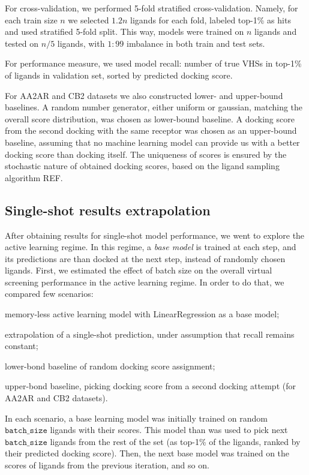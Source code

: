 For cross-validation, we performed 5-fold stratified cross-validation. Namely, for each train size $n$ we selected $1.2n$ ligands for each fold, labeled top-1\% as hits and used stratified 5-fold split. This way, models were trained on $n$ ligands and tested on $n/5$ ligands, with $1:99$ imbalance in both train and test sets.

For performance measure, we used model recall: number of true VHSs in top-1\% of ligands in validation set, sorted by predicted docking score.

For AA2AR and CB2 datasets we also constructed lower- and upper-bound baselines. A random number generator, either uniform or gaussian, matching the overall score distribution, was chosen as lower-bound baseline. A docking score from the second docking with the same receptor was chosen as an upper-bound baseline, assuming that no machine learning model can provide us with a better docking score than docking itself. The uniqueness of scores is ensured by the stochastic nature of obtained docking scores, based on the ligand sampling algorithm REF.

\subsection{Single-shot results extrapolation}

After obtaining results for single-shot model performance, we went to explore the active learning regime. In this regime, a \textit{base model} is trained at each step, and its predictions are than docked at the next step, instead of randomly chosen ligands. First, we estimated the effect of batch size on the overall virtual screening performance in the active learning regime. In order to do that, we compared few scenarios: 
\begin{enumerate*}[label=(\roman*)]
    \item memory-less active learning model with LinearRegression as a base model;
    \item extrapolation of a single-shot prediction, under assumption that recall remains constant;
    \item lower-bond baseline of random docking score assignment;
    \item upper-bond baseline, picking docking score from a second docking attempt (for AA2AR and CB2 datasets).
\end{enumerate*}

In each scenario, a base learning model was initially trained on random $\texttt{batch\_size}$ ligands with their scores. This model than was used to pick next $\texttt{batch\_size}$ ligands from the rest of the set (as top-1\% of the ligands, ranked by their predicted docking score). Then, the next base model was trained on the scores of ligands from the previous iteration, and so on.

